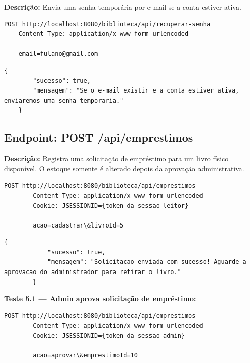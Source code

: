 \textbf{Descrição:} Envia uma senha temporária por e-mail se a conta estiver ativa.

\begin{lstlisting}[style=sqlStyle, caption={Requisição: POST /api/recuperar-senha}]
	POST http://localhost:8080/biblioteca/api/recuperar-senha
	Content-Type: application/x-www-form-urlencoded
	
	email=fulano@gmail.com
\end{lstlisting}

\begin{lstlisting}[style=sqlStyle, caption={Resposta esperada (HTTP 200 OK)}]
	{
		"sucesso": true,
		"mensagem": "Se o e-mail existir e a conta estiver ativa, enviaremos uma senha temporaria."
	}
\end{lstlisting}
	
	\subsection{Endpoint: POST /api/emprestimos}
	
	\textbf{Descrição:} Registra uma solicitação de empréstimo para um livro físico disponível. O estoque somente é alterado depois da aprovação administrativa.
	
	\begin{lstlisting}[style=sqlStyle, caption={Requisição: POST /api/emprestimos}]
		POST http://localhost:8080/biblioteca/api/emprestimos
		Content-Type: application/x-www-form-urlencoded
		Cookie: JSESSIONID={token_da_sessao_leitor}
		
		acao=cadastrar\&livroId=5
	\end{lstlisting}
	
	\begin{lstlisting}[style=sqlStyle, caption={Resposta esperada (HTTP 200 OK)}]
		{
			"sucesso": true,
			"mensagem": "Solicitacao enviada com sucesso! Aguarde a aprovacao do administrador para retirar o livro."
		}
	\end{lstlisting}

	\textbf{Teste 5.1 --- Admin aprova solicitação de empréstimo:}

	\begin{lstlisting}[style=sqlStyle, caption={Requisição: POST /api/emprestimos acao=aprovar}]
		POST http://localhost:8080/biblioteca/api/emprestimos
		Content-Type: application/x-www-form-urlencoded
		Cookie: JSESSIONID={token_da_sessao_admin}
		
		acao=aprovar\&emprestimoId=10
	\end{lstlisting}

